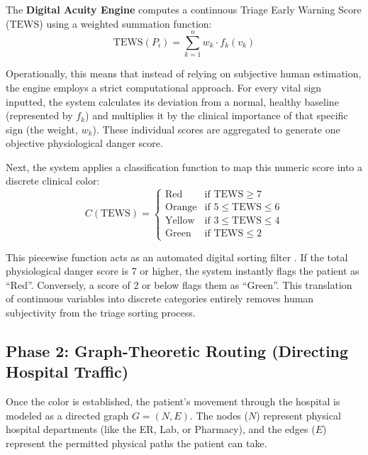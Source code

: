 \documentclass[12pt, a4paper]{article}
\begin{document}
	The \textbf{Digital Acuity Engine} computes a continuous Triage Early Warning Score ($\text{TEWS}$) using a weighted summation function:
	\begin{equation}
		\text{TEWS}(P_i) = \sum_{k=1}^{n} w_k \cdot f_k(v_k)
	\end{equation}
	
	Operationally, this means that instead of relying on subjective human estimation, the engine employs a strict computational approach. For every vital sign inputted, the system calculates its deviation from a normal, healthy baseline (represented by $f_k$) and multiplies it by the clinical importance of that specific sign (the weight, $w_k$). These individual scores are aggregated to generate one objective physiological danger score. 
	
	Next, the system applies a classification function to map this numeric score into a discrete clinical color:
	\begin{equation}
		C(\text{TEWS}) = 
		\begin{cases} 
			\text{Red} & \text{if } \text{TEWS} \geq 7 \\
			\text{Orange} & \text{if } 5 \leq \text{TEWS} \leq 6 \\
			\text{Yellow} & \text{if } 3 \leq \text{TEWS} \leq 4 \\
			\text{Green} & \text{if } \text{TEWS} \leq 2 
		\end{cases}
	\end{equation}
	
	This piecewise function acts as an automated digital sorting filter \cite{rominski2014}. If the total physiological danger score is 7 or higher, the system instantly flags the patient as ``Red''. Conversely, a score of 2 or below flags them as ``Green''. This translation of continuous variables into discrete categories entirely removes human subjectivity from the triage sorting process.
	
	\subsection*{Phase 2: Graph-Theoretic Routing (Directing Hospital Traffic)}
	Once the color is established, the patient's movement through the hospital is modeled as a directed graph $G = (N, E)$. The nodes ($N$) represent physical hospital departments (like the ER, Lab, or Pharmacy), and the edges ($E$) represent the permitted physical paths the patient can take.
	
\end{document}
